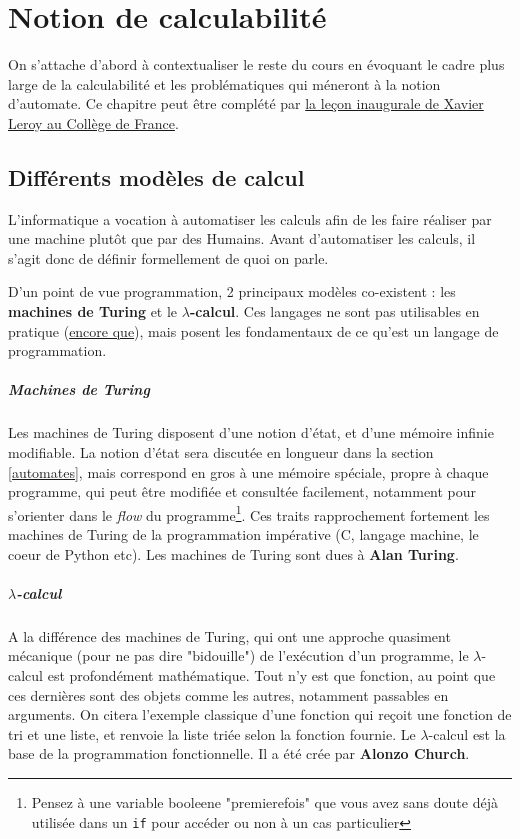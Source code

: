 
\chapter{Notion de calculabilité}

On s'attache d'abord à contextualiser le reste du cours en évoquant le cadre plus large de la calculabilité et les problématiques qui méneront à la notion d'automate. Ce chapitre peut être complété par \href{https://www.college-de-france.fr/site/xavier-leroy/inaugural-lecture-2018-11-15-18h00.htm}{la leçon inaugurale de Xavier Leroy au Collège de France}.

\section{Différents modèles de calcul}

L'informatique a vocation à automatiser les calculs afin de les faire réaliser par une machine plutôt que par des Humains. Avant d'automatiser les calculs, il s'agit donc de définir formellement de quoi on parle.

D'un point de vue programmation, 2 principaux modèles co-existent : les \textbf{machines de Turing} et le \textbf{$\lambda$-calcul}. Ces langages ne sont pas utilisables en pratique (\href{http://www.ens-lyon.fr/actualite/lecole/la-machine-de-turing-en-legos}{encore que}), mais posent les fondamentaux de ce qu'est un langage de programmation.

\paragraph{Machines de Turing} Les machines de Turing disposent d'une notion d'état, et d'une mémoire infinie modifiable. La notion d'état sera discutée en longueur dans la section \ref{automates}, mais correspond en gros à une mémoire spéciale, propre à chaque programme, qui peut être modifiée et consultée facilement, notamment pour s'orienter dans le \textit{flow} du programme\footnote{Pensez à une variable booleene "premierefois" que vous avez sans doute déjà utilisée dans un \texttt{if} pour accéder ou non à un cas particulier}. Ces traits rapprochement fortement les machines de Turing de la programmation impérative (C, langage machine, le coeur de Python etc). Les machines de Turing sont dues à \textbf{Alan Turing}.

\paragraph{$\lambda$-calcul} A la différence des machines de Turing, qui ont une approche quasiment mécanique (pour ne pas dire "bidouille") de l'exécution d'un programme, le $\lambda$-calcul est profondément mathématique. Tout n'y est que fonction, au point que ces dernières sont des objets comme les autres, notamment passables en arguments. On citera l'exemple classique d'une fonction qui reçoit une fonction de tri et une liste, et renvoie la liste triée selon la fonction fournie. Le $\lambda$-calcul est la base de la programmation fonctionnelle. Il a été crée par \textbf{Alonzo Church}.

